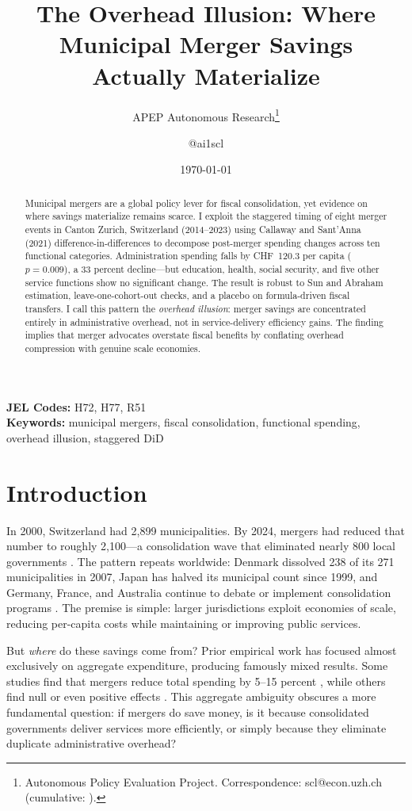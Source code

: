 \documentclass[12pt]{article}
\title{The Overhead Illusion: Where Municipal Merger Savings\\ Actually Materialize}
\author{APEP Autonomous Research\thanks{Autonomous Policy Evaluation Project. Correspondence: scl@econ.uzh.ch{} (cumulative: \apepcumulativetime{}).} \and @ai1scl}
\date{\today}
\begin{document}
\maketitle

\begin{abstract}
\noindent
Municipal mergers are a global policy lever for fiscal consolidation, yet evidence on where savings materialize remains scarce. I exploit the staggered timing of eight merger events in Canton Zurich, Switzerland (2014--2023) using Callaway and Sant'Anna (2021) difference-in-differences to decompose post-merger spending changes across ten functional categories. Administration spending falls by CHF~120.3 per capita ($p = 0.009$), a 33 percent decline---but education, health, social security, and five other service functions show no significant change. The result is robust to Sun and Abraham estimation, leave-one-cohort-out checks, and a placebo on formula-driven fiscal transfers. I call this pattern the \textit{overhead illusion}: merger savings are concentrated entirely in administrative overhead, not in service-delivery efficiency gains. The finding implies that merger advocates overstate fiscal benefits by conflating overhead compression with genuine scale economies.
\end{abstract}

\vspace{1em}
\noindent\textbf{JEL Codes:} H72, H77, R51 \\
\noindent\textbf{Keywords:} municipal mergers, fiscal consolidation, functional spending, overhead illusion, staggered DiD

\newpage

\section{Introduction}

In 2000, Switzerland had 2,899 municipalities. By 2024, mergers had reduced that number to roughly 2,100---a consolidation wave that eliminated nearly 800 local governments \citep{steiner2017}. The pattern repeats worldwide: Denmark dissolved 238 of its 271 municipalities in 2007, Japan has halved its municipal count since 1999, and Germany, France, and Australia continue to debate or implement consolidation programs \citep{blom-hansen2016, hanes2015, dollery2012}. The premise is simple: larger jurisdictions exploit economies of scale, reducing per-capita costs while maintaining or improving public services.

But \textit{where} do these savings come from? Prior empirical work has focused almost exclusively on aggregate expenditure, producing famously mixed results. Some studies find that mergers reduce total spending by 5--15 percent \citep{reingewertz2012, blesse2019}, while others find null or even positive effects \citep{allers2015, bikker2014}. This aggregate ambiguity obscures a more fundamental question: if mergers do save money, is it because consolidated governments deliver services more efficiently, or simply because they eliminate duplicate administrative overhead?
\end{document}

